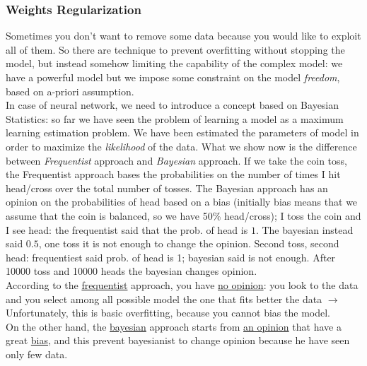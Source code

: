 \subsubsection{Weights Regularization}
Sometimes you don't want to remove some data because you would like to exploit all of them. So there are technique to prevent overfitting without stopping the model, but instead somehow limiting the capability of the complex model: we have a powerful model but we impose some constraint on the model \textit{freedom}, based on a-priori assumption. \\
In case of neural network, we need to introduce a concept based on Bayesian Statistics: so far we have seen the problem of learning a model as a maximum learning estimation problem. We have been estimated the parameters of model in order to maximize the \textit{likelihood} of the data. What we show now is the difference between \textit{Frequentist} approach and \textit{Bayesian} approach. If we take the coin toss, the Frequentist approach bases the probabilities on the number of times I hit head/cross over the total number of tosses. The Bayesian approach has an opinion on the probabilities of head based on a bias (initially bias means that we assume that the coin is balanced, so we have 50\% head/cross); I toss the coin and I see head: the frequentist said that the prob. of head is $1$. The bayesian instead said $0.5$, one toss it is not enough to change the opinion. Second toss, second head: frequentiest said prob. of head is 1; bayesian said is not enough. After 10000 toss and 10000 heads the bayesian changes opinion. \\

According to the \underline{frequentist} approach, you have \underline{no opinion}: you look to the data and you select among all possible model the one that fits better the data $\rightarrow$ Unfortunately, this is basic overfitting, because you cannot bias the model. \\

On the other hand, the \underline{bayesian} approach starts from \underline{an opinion} that have a great \underline{bias}, and this prevent bayesianist to change opinion because he have seen only few data. \\

